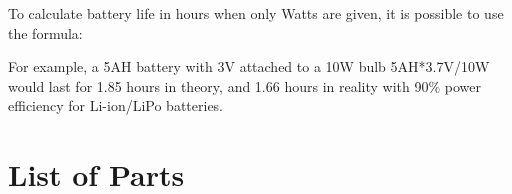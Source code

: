 To calculate battery life in hours when only Watts are given, it is possible to use the formula: 



For example, a 5AH battery with 3V attached to a 10W bulb  5AH*3.7V/10W  would last for 1.85 hours in theory, and 1.66 hours in reality with 90\% power efficiency for Li-ion/LiPo batteries. 

\section{List of Parts}







